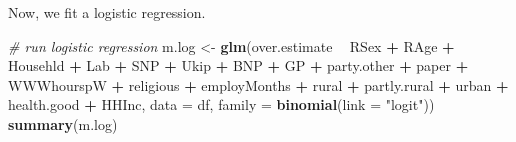 \documentclass[]{article}
\newenvironment{Shaded}{\begin{snugshade}}{\end{snugshade}}
\newcommand{\CommentTok}[1]{\textcolor[rgb]{0.56,0.35,0.01}{\textit{#1}}}
\newcommand{\DataTypeTok}[1]{\textcolor[rgb]{0.13,0.29,0.53}{#1}}
\newcommand{\KeywordTok}[1]{\textcolor[rgb]{0.13,0.29,0.53}{\textbf{#1}}}
\newcommand{\NormalTok}[1]{#1}
\newcommand{\OperatorTok}[1]{\textcolor[rgb]{0.81,0.36,0.00}{\textbf{#1}}}
\newcommand{\StringTok}[1]{\textcolor[rgb]{0.31,0.60,0.02}{#1}}
\begin{document}
Now, we fit a logistic regression.

\begin{Shaded}
\begin{Highlighting}[]
\CommentTok{# run logistic regression}
\NormalTok{m.log <-}\StringTok{ }\KeywordTok{glm}\NormalTok{(over.estimate }\OperatorTok{~}\StringTok{ }\NormalTok{RSex }\OperatorTok{+}\StringTok{ }\NormalTok{RAge }\OperatorTok{+}\StringTok{ }\NormalTok{Househld }\OperatorTok{+}\StringTok{ }\NormalTok{Lab }\OperatorTok{+}\StringTok{ }\NormalTok{SNP }\OperatorTok{+}\StringTok{ }\NormalTok{Ukip }\OperatorTok{+}\StringTok{ }\NormalTok{BNP }\OperatorTok{+}\StringTok{ }
\StringTok{               }\NormalTok{GP }\OperatorTok{+}\StringTok{ }\NormalTok{party.other }\OperatorTok{+}\StringTok{ }\NormalTok{paper }\OperatorTok{+}\StringTok{ }\NormalTok{WWWhourspW }\OperatorTok{+}\StringTok{  }\NormalTok{religious }\OperatorTok{+}\StringTok{ }
\StringTok{               }\NormalTok{employMonths }\OperatorTok{+}\StringTok{ }\NormalTok{rural }\OperatorTok{+}\StringTok{ }\NormalTok{partly.rural }\OperatorTok{+}\StringTok{ }\NormalTok{urban }\OperatorTok{+}\StringTok{ }
\StringTok{               }\NormalTok{health.good }\OperatorTok{+}\StringTok{ }\NormalTok{HHInc, }\DataTypeTok{data =}\NormalTok{ df,}
             \DataTypeTok{family =} \KeywordTok{binomial}\NormalTok{(}\DataTypeTok{link =} \StringTok{"logit"}\NormalTok{))}
\KeywordTok{summary}\NormalTok{(m.log)}
\end{Highlighting}
\end{Shaded}
\end{document}
